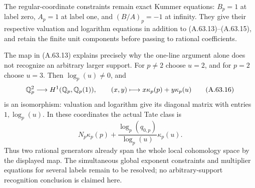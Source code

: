 The regular-coordinate constraints remain exact Kummer
equations: $B_p=1$ at label zero, $A_p=1$ at label one,
and $(B/A)_p=-1$ at infinity.  They give their respective
valuation and logarithm equations in addition to
(A.63.13)--(A.63.15), and retain the finite unit components
before passing to rational coefficients.

The map in (A.63.13) explains precisely why the one-line
argument alone does not recognize an arbitrary larger
support.  For $p\ne2$ choose $u=2$, and for $p=2$ choose
$u=3$.  Then $\log_p(u)\ne0$, and
\[
 \mathbb Q_p^2\longrightarrow H^1(\mathbb Q_p,\mathbb Q_p(1)),\qquad
       (x,y)\longmapsto x\kappa_p(p)+y\kappa_p(u)
\tag{A.63.16}
\]
is an isomorphism: valuation and logarithm give its diagonal
matrix with entries $1,\log_p(u)$.
In these coordinates the actual Tate class is
\[
             N_p\kappa_p(p)
               +\frac{\log_p(q_{0,p})}{\log_p(u)}
                                      \kappa_p(u).
\tag{A.63.17}
\]
Thus two rational generators already span the whole local
cohomology space by the displayed map.  The simultaneous
global exponent constraints and multiplier equations for
several labels remain to be resolved; no arbitrary-support
recognition conclusion is claimed here.
